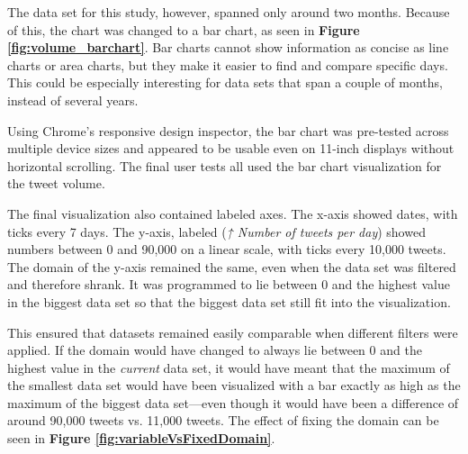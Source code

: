 The data set for this study, however, spanned only around two months. Because of this, the chart was changed to a bar chart, as seen in \textbf{Figure \ref{fig:volume_barchart}}. Bar charts cannot show information as concise as line charts or area charts, but they make it easier to find and compare specific days. This could be especially interesting for data sets that span a couple of months, instead of several years.

Using Chrome's responsive design inspector, the bar chart was pre-tested across multiple device sizes and appeared to be usable even on 11-inch displays without horizontal scrolling. The final user tests all used the bar chart visualization for the tweet volume.

The final visualization also contained labeled axes. The x-axis showed dates, with ticks every 7 days. The y-axis, labeled  (\emph{↑ Number of tweets per day}) showed numbers between 0 and 90,000 on a linear scale, with ticks every 10,000 tweets. The domain of the y-axis remained the same, even when the data set was filtered and therefore shrank. It was programmed to lie between 0 and the highest value in the biggest data set so that the biggest data set still fit into the visualization.

This ensured that datasets remained easily comparable when different filters were applied. If the domain would have changed to always lie between 0 and the highest value in the \emph{current} data set, it would have meant that the maximum of the smallest data set would have been visualized with a bar exactly as high as the maximum of the biggest data set---even though it would have been a difference of around 90,000 tweets vs. 11,000 tweets. The effect of fixing the domain can be seen in \textbf{Figure \ref{fig:variableVsFixedDomain}}.

